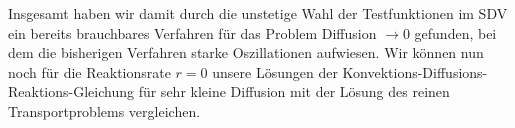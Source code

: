 \begin{figure}[H]
\end{figure}

Insgesamt haben wir damit durch die unstetige Wahl der Testfunktionen im SDV ein bereits brauchbares Verfahren für das Problem Diffusion $\to 0$ gefunden, bei dem die bisherigen Verfahren  starke Oszillationen aufwiesen. 
Wir können nun noch für die Reaktionsrate $r=0$ unsere Lösungen der Konvektions-Diffusions-Reaktions-Gleichung für sehr kleine Diffusion mit der Lösung des reinen Transportproblems vergleichen.

